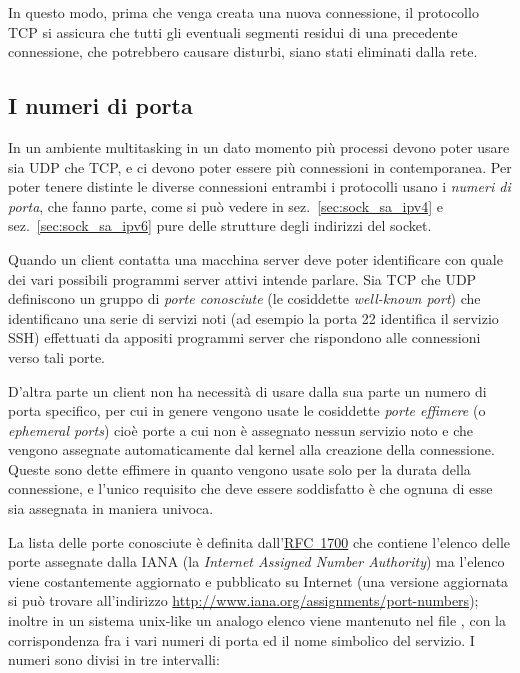 In questo modo, prima che venga creata una nuova connessione, il protocollo
TCP si assicura che tutti gli eventuali segmenti residui di una precedente
connessione, che potrebbero causare disturbi, siano stati eliminati dalla
rete.


\subsection{I numeri di porta}
\label{sec:TCP_port_num}

In un ambiente multitasking in un dato momento più processi devono poter usare
sia UDP che TCP, e ci devono poter essere più connessioni in contemporanea.
Per poter tenere distinte le diverse connessioni entrambi i protocolli usano i
\textsl{numeri di porta}, che fanno parte, come si può vedere in
sez.~\ref{sec:sock_sa_ipv4} e sez.~\ref{sec:sock_sa_ipv6} pure delle strutture
degli indirizzi del socket.

Quando un client contatta una macchina server deve poter identificare con
quale dei vari possibili programmi server attivi intende parlare. Sia TCP che
UDP definiscono un gruppo di \textsl{porte conosciute} (le cosiddette
\textit{well-known port}) che identificano una serie di servizi noti (ad
esempio la porta 22 identifica il servizio SSH) effettuati da appositi
programmi server che rispondono alle connessioni verso tali porte.

D'altra parte un client non ha necessità di usare dalla sua parte un numero di
porta specifico, per cui in genere vengono usate le cosiddette \textsl{porte
  effimere} (o \textit{ephemeral ports}) cioè porte a cui non è assegnato
nessun servizio noto e che vengono assegnate automaticamente dal kernel alla
creazione della connessione. Queste sono dette effimere in quanto vengono
usate solo per la durata della connessione, e l'unico requisito che deve
essere soddisfatto è che ognuna di esse sia assegnata in maniera univoca.

La lista delle porte conosciute è definita
dall'\href{http://www.ietf.org/rfc/rfc1700.txt}{RFC~1700} che contiene
l'elenco delle porte assegnate dalla IANA (la \textit{Internet Assigned Number
  Authority}) ma l'elenco viene costantemente aggiornato e pubblicato su
Internet (una versione aggiornata si può trovare all'indirizzo
\url{http://www.iana.org/assignments/port-numbers}); inoltre in un sistema
unix-like un analogo elenco viene mantenuto nel file ,
con la corrispondenza fra i vari numeri di porta ed il nome simbolico del
servizio.  I numeri sono divisi in tre intervalli:

